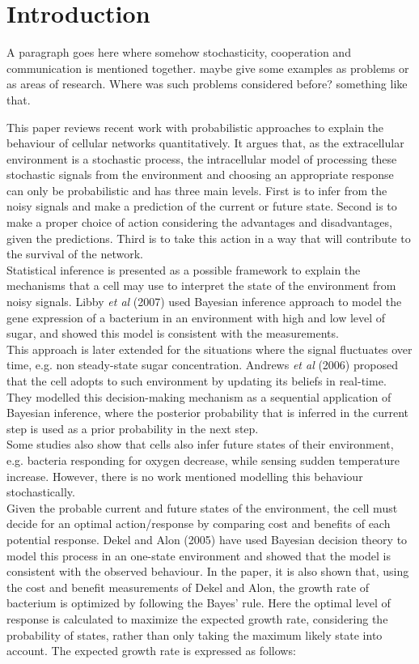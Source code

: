\chapter{Introduction}
A paragraph goes here where somehow stochasticity, cooperation and communication is mentioned together. maybe give some examples as problems or as areas of research. Where was such problems considered before? something like that.

This paper reviews recent work with probabilistic approaches to explain the behaviour of cellular networks quantitatively. It argues that, as the extracellular environment is a stochastic process, the intracellular model of processing these stochastic signals from the environment and choosing an appropriate response can only be probabilistic and has three main levels. First is to infer from the noisy signals and make a prediction of the current or future state. Second is to make a proper choice of action considering the advantages and disadvantages, given the predictions. Third is to take this action in a way that will contribute to the survival of the network.\\
Statistical inference is presented as a possible framework to explain the mechanisms that a cell may use to interpret the state of the environment from noisy signals. Libby \textit{et al} (2007) used Bayesian inference approach to model the gene expression of a bacterium in an environment with high and low level of sugar, and showed this model is consistent with the measurements.\\
This approach is later extended for the situations where the signal fluctuates over time, e.g. non steady-state sugar concentration. Andrews \textit{et al} (2006) proposed that the cell adopts to such environment by updating its beliefs in real-time. They modelled this decision-making mechanism as a sequential application of Bayesian inference, where the posterior probability that is inferred in the current step is used as a prior probability in the next step.\\
Some studies also show that cells also infer future states of their environment, e.g. bacteria responding for oxygen decrease, while sensing sudden temperature increase. However, there is no work mentioned modelling this behaviour stochastically.\\
Given the probable current and future states of the environment, the cell must decide for an optimal action/response by comparing cost and benefits of each potential response. Dekel and Alon (2005) have used Bayesian decision theory to model this process in an one-state environment and showed that the model is consistent with the observed behaviour. In the paper, it is also shown that, using the cost and benefit measurements of Dekel and Alon, the growth rate of bacterium is optimized by following the Bayes' rule. Here the optimal level of response is calculated to maximize the expected growth rate, considering the probability of states, rather than only taking the maximum likely state into account. The expected growth rate is expressed as follows:
